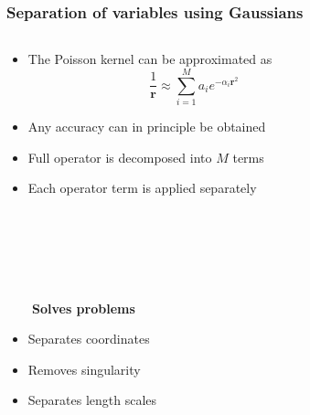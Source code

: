 \begin{frame}
    \frametitle{Separation of variables using Gaussians}
    \begin{columns}
    \begin{column}{.50\textwidth}
    \begin{itemize}
	\item The Poisson kernel can be approximated as
	    \begin{equation}
		\nonumber
		\frac{1}{\boldsymbol{r}} \approx \sum_{i=1}^M a_i e^{-\alpha_i \boldsymbol{r}^2} 
	    \end{equation}
	\item Any accuracy can in principle be obtained
	\item Full operator is decomposed into $M$ terms
	\item Each operator term is applied separately
    \end{itemize}
    \ \\
    \ \\
    \ \\
    \ \\
    \ \\
    \pause
    \pause
    \pause
    \pause
    \pause
    \pause
    \pause
    \ \ \ \ \textbf{Solves problems}
    \begin{itemize}
	\item	Separates coordinates
	\item	Removes singularity
	\item	Separates length scales
    \end{itemize}
    \end{column}
    \begin{column}{.50\textwidth}
	\only<1,2,3,4,5>{\ \\}

\end{column}
\end{columns}
\end{frame}
